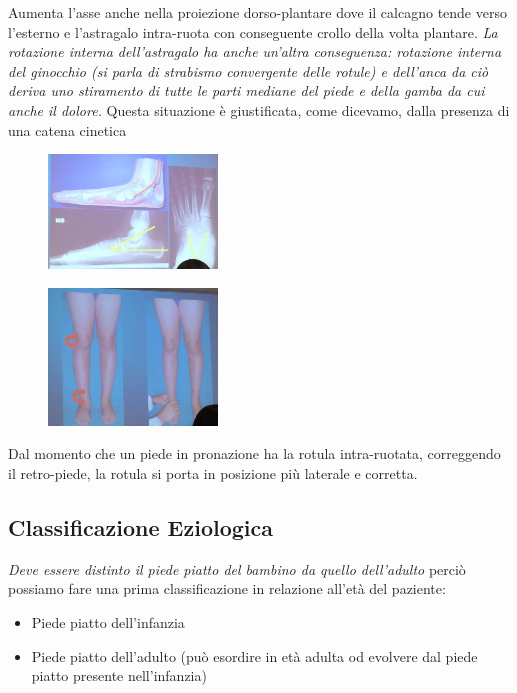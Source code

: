 Aumenta l'asse anche nella proiezione dorso-plantare dove il calcagno tende verso l'esterno e l'astragalo intra-ruota con conseguente crollo della volta plantare. \emph{La rotazione interna dell'astragalo ha anche
un'altra conseguenza: rotazione interna del ginocchio (\emph{si parla di strabismo convergente delle rotule}) e dell'anca da ciò deriva uno stiramento di tutte le parti mediane del piede e della gamba da cui anche il dolore.} Questa situazione è giustificata, come dicevamo, dalla
presenza di una catena cinetica

\begin{figure}[!ht]
\centering
\includegraphics[width=0.4\textwidth]{014/image4.jpeg}
\end{figure}

\begin{figure}[!ht]
\centering
\includegraphics[width=0.4\textwidth]{014/image5.jpeg}
\end{figure}

Dal momento che un piede in pronazione ha la rotula intra-ruotata, correggendo il retro-piede, la rotula si porta in posizione più laterale e corretta.

\subsection{Classificazione Eziologica}

\emph{Deve essere distinto il piede piatto del bambino da quello dell'adulto} perciò possiamo fare una prima classificazione in relazione all'età del paziente:

\begin{itemize}
\item
  Piede piatto dell'infanzia
\item
  Piede piatto dell'adulto (può esordire in età adulta od evolvere dal piede piatto presente nell'infanzia)
\end{itemize}

